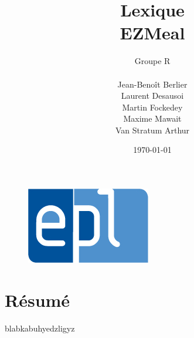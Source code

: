 \documentclass[a4paper,10pt]{article}
\title{Lexique \\EZMeal}
\author{Groupe R\\ \\Jean-Benoît Berlier\\Laurent Desausoi \\ Martin Fockedey \\Maxime Mawait \\Van Stratum Arthur
}
\date{\today}
\begin{document}
\begin{titlepage}
\begin{figure}[t]
\includegraphics[scale=0.3]{epl-logo.jpg}
\end{figure}

\maketitle 
\end{titlepage}
\section*{Résumé}
blabkabuhyedzligyz
\end{document}

